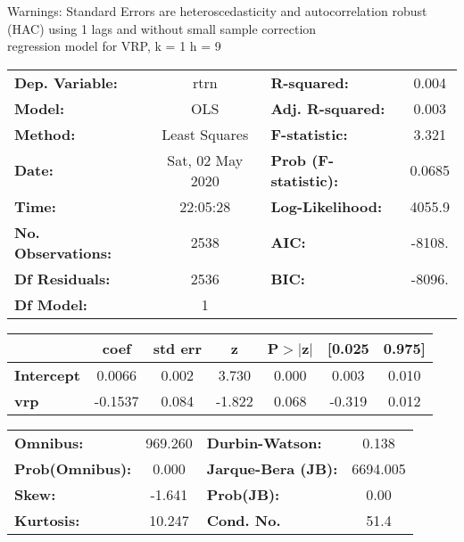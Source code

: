 Warnings: \newline
 [1] Standard Errors are heteroscedasticity and autocorrelation robust (HAC) using 1 lags and without small sample correction\\ 

regression model for VRP, k = 1 h = 9\begin{center}
\begin{tabular}{lclc}
\toprule
\textbf{Dep. Variable:}    &       rtrn       & \textbf{  R-squared:         } &     0.004   \\
\textbf{Model:}            &       OLS        & \textbf{  Adj. R-squared:    } &     0.003   \\
\textbf{Method:}           &  Least Squares   & \textbf{  F-statistic:       } &     3.321   \\
\textbf{Date:}             & Sat, 02 May 2020 & \textbf{  Prob (F-statistic):} &   0.0685    \\
\textbf{Time:}             &     22:05:28     & \textbf{  Log-Likelihood:    } &    4055.9   \\
\textbf{No. Observations:} &        2538      & \textbf{  AIC:               } &    -8108.   \\
\textbf{Df Residuals:}     &        2536      & \textbf{  BIC:               } &    -8096.   \\
\textbf{Df Model:}         &           1      & \textbf{                     } &             \\
\bottomrule
\end{tabular}
\begin{tabular}{lcccccc}
                   & \textbf{coef} & \textbf{std err} & \textbf{z} & \textbf{P$> |$z$|$} & \textbf{[0.025} & \textbf{0.975]}  \\
\midrule
\textbf{Intercept} &       0.0066  &        0.002     &     3.730  &         0.000        &        0.003    &        0.010     \\
\textbf{vrp}       &      -0.1537  &        0.084     &    -1.822  &         0.068        &       -0.319    &        0.012     \\
\bottomrule
\end{tabular}
\begin{tabular}{lclc}
\textbf{Omnibus:}       & 969.260 & \textbf{  Durbin-Watson:     } &    0.138  \\
\textbf{Prob(Omnibus):} &   0.000 & \textbf{  Jarque-Bera (JB):  } & 6694.005  \\
\textbf{Skew:}          &  -1.641 & \textbf{  Prob(JB):          } &     0.00  \\
\textbf{Kurtosis:}      &  10.247 & \textbf{  Cond. No.          } &     51.4  \\
\bottomrule
\end{tabular}
\end{center}

